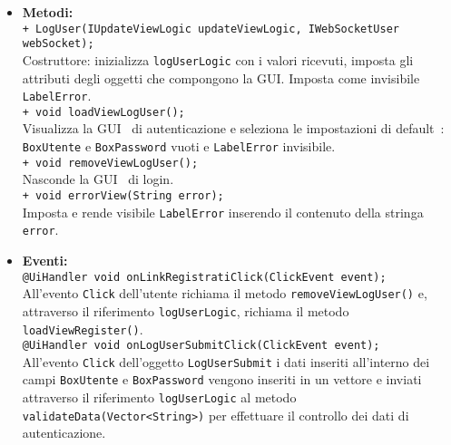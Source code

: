 {\begin{sloppypar}
{{\begin{itemize}
				\texttt{@UiField PushButton LogUserSubmit;}\\
				Bottone per l'invio della richiesta controllo delle credenziali di autenticazione.\\
				
				\texttt{@UiField InlineHyperlink LinkRegistrati;}\\
				Link per passare alla grafica della registrazione.\\
				
			\item[] \textbf{Metodi:}\\
				\texttt{+ LogUser(IUpdateViewLogic updateViewLogic, IWebSocketUser webSocket);}\\
				Costruttore: inizializza \texttt{logUserLogic} con i valori ricevuti, imposta gli attributi degli oggetti che compongono la GUI\g. Imposta come invisibile \texttt{LabelError}.\\
				
				\texttt{+ void loadViewLogUser();}\\
				Visualizza la GUI\g~ di autenticazione e seleziona le impostazioni di default\g~: \texttt{BoxUtente} e \texttt{BoxPassword} vuoti e \texttt{LabelError} invisibile.\\
				
				\texttt{+ void removeViewLogUser();}\\
				Nasconde la GUI\g~ di login.\\
				
				\texttt{+ void errorView(String error);}\\
				Imposta e rende visibile \texttt{LabelError} inserendo il contenuto della stringa \texttt{error}.\\
				
			\item[] \textbf{Eventi:}\\
				\texttt{@UiHandler void onLinkRegistratiClick(ClickEvent event);}\\
				All'evento \texttt{Click} dell'utente richiama il metodo \texttt{removeViewLogUser()} e, attraverso il riferimento \texttt{logUserLogic}, richiama il metodo \texttt{loadViewRegister()}.\\
				
				\texttt{@UiHandler void onLogUserSubmitClick(ClickEvent event);}\\
				All'evento \texttt{Click} dell'oggetto \texttt{LogUserSubmit} i dati inseriti all'interno dei campi \texttt{BoxUtente} e \texttt{BoxPassword} vengono inseriti in un vettore e inviati attraverso il riferimento \texttt{logUserLogic} al metodo \texttt{validateData(Vector<String>)} per effettuare il controllo dei dati di autenticazione.\\
		\end{itemize}
		}
		
}
\end{sloppypar}}
